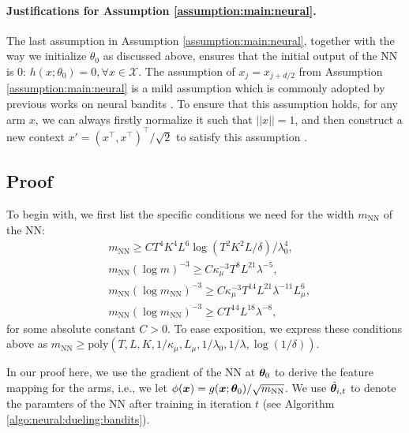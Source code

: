 \paragraph{Justifications for Assumption \ref{assumption:main:neural}.}
The last assumption in Assumption \ref{assumption:main:neural}, together with the way we initialize $\theta_0$ as discussed above, ensures that the initial output of the NN is $0$: $h(x;\theta_0)=0,\forall x\in\mathcal{X}$.
The assumption of $x_{j}=x_{j+d/2}$ from Assumption \ref{assumption:main:neural} is a mild assumption which is commonly adopted by previous works on neural bandits \cite{zhou2020neural,zhang2020neural}. 
To ensure that this assumption holds, for any arm $x$, we can always firstly normalize it such that $||x|| = 1$, and then construct a new context $x' = (x^\top,x^\top)^\top/\sqrt{2}$ to satisfy this assumption \cite{zhou2020neural}.


\subsection{Proof}
\label{app:subsec:proof:neural:real:proof}

To begin with, we first list the specific conditions we need for the width $m_{\text{NN}}$ of the NN:
\begin{equation}
	\begin{split}
	&m_{\text{NN}} \geq C T^4K^4 L^6\log(T^2K^2 L/\delta) / \lambda_0^4,\\
	&m_{\text{NN}}(\log m)^{-3} \geq C \kappa_\mu^{-3} T^{8} L^{21} \lambda^{-5} ,\\
	&m_{\text{NN}}(\log m_{\text{NN}})^{-3} \geq C \kappa_\mu^{-3} T^{14} L^{21} \lambda^{-11} L_\mu^6,\\
	&m_{\text{NN}}(\log m_{\text{NN}})^{-3} \geq C T^{14} L^{18} \lambda^{-8},
	\end{split}
	\label{eq:conditions:on:m}
\end{equation}
for some absolute constant $C>0$.
To ease exposition, we express these conditions above as 
$m_{\text{NN}} \geq \text{poly}(T, L, K, 1/\kappa_\mu, L_\mu, 1/\lambda_0, 1/\lambda, \log(1/\delta))$.

In our proof here, we use the gradient of the NN  at $\boldsymbol{\theta}_0$ to derive the feature mapping for the arms, i.e., we let $\phi(\boldsymbol{x}) = g(\boldsymbol{x};\boldsymbol{\theta}_0) / \sqrt{m_{\text{NN}}}$.
We use $\hat{\boldsymbol{\theta}}_{i,t}$ to denote the paramters of the NN after training in iteration $t$ (see Algorithm \ref{algo:neural:dueling:bandits}).

